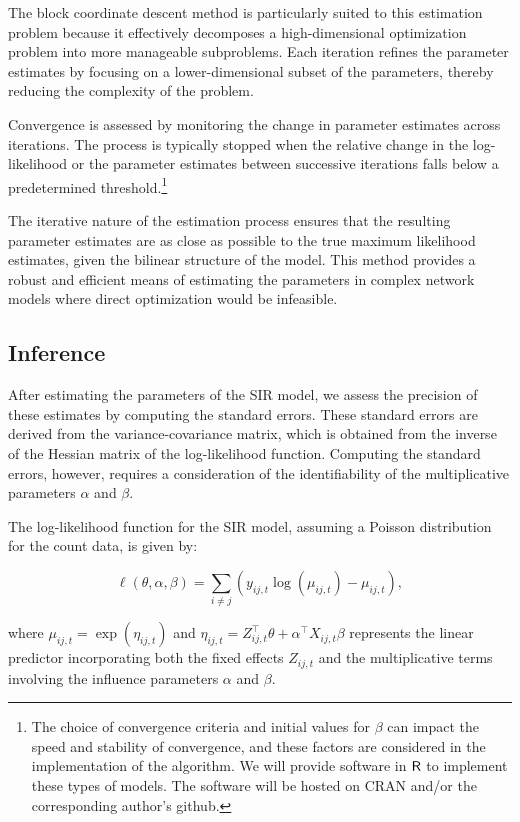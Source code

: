 The block coordinate descent method is particularly suited to this estimation problem because it effectively decomposes a high-dimensional optimization problem into more manageable subproblems. Each iteration refines the parameter estimates by focusing on a lower-dimensional subset of the parameters, thereby reducing the complexity of the problem.

Convergence is assessed by monitoring the change in parameter estimates across iterations. The process is typically stopped when the relative change in the log-likelihood or the parameter estimates between successive iterations falls below a predetermined threshold.\footnote{The choice of convergence criteria and initial values for $\beta$ can impact the speed and stability of convergence, and these factors are considered in the implementation of the algorithm. We will provide software in $\sf{R}$ to implement these types of models. The software will be hosted on CRAN and/or the corresponding author's github.}

The iterative nature of the estimation process ensures that the resulting parameter estimates are as close as possible to the true maximum likelihood estimates, given the bilinear structure of the model. This method provides a robust and efficient means of estimating the parameters in complex network models where direct optimization would be infeasible.

\subsection*{Inference}

After estimating the parameters of the SIR model, we assess the precision of these estimates by computing the standard errors. These standard errors are derived from the variance-covariance matrix, which is obtained from the inverse of the Hessian matrix of the log-likelihood function. Computing the standard errors, however, requires a consideration of the identifiability of the multiplicative parameters $ \alpha $ and $ \beta $.

The log-likelihood function for the SIR model, assuming a Poisson distribution for the count data, is given by:

\[
\ell(\theta, \alpha, \beta) = \sum_{i \neq j} \left( y_{ij,t} \log(\mu_{ij,t}) - \mu_{ij,t} \right),
\]

where $ \mu_{ij,t} = \exp(\eta_{ij,t}) $ and $ \eta_{ij,t} = Z_{ij,t}^\top \theta + \alpha^\top X_{ij,t} \beta $ represents the linear predictor incorporating both the fixed effects $Z_{ij,t}$ and the multiplicative terms involving the influence parameters $\alpha$ and $\beta$.

